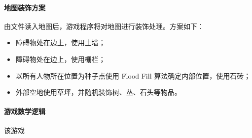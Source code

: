 \paragraph{地图装饰方案}
由文件读入地图后，游戏程序将对地图进行装饰处理。方案如下：
\begin{itemize}
	\item 障碍物处在边上，使用土墙；
	\item 障碍物处在边上，使用栅栏；
	\item 以所有人物所在位置为种子点使用 Flood Fill 算法确定内部位置，使用石砖；
	\item 外部空地使用草坪，并随机装饰树、丛、石头等物品。
\end{itemize}

\paragraph{游戏数学逻辑}
该游戏


